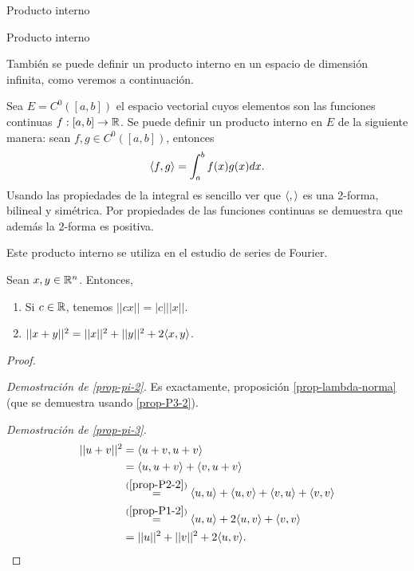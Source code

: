 \begin{chapter}{Producto interno}
\begin{section}{Producto interno}
        \begin{ejemplo*} También  se puede definir un producto interno en un espacio de dimensión infinita, como veremos a continuación.
            
            Sea $E = C^0([a,b])$ el espacio vectorial cuyos elementos son las funciones continuas $f: [a, b] \to\mathbb R$. Se puede definir un producto interno en $E$ de la siguiente manera: sean $f,g \in  C^0([a,b])$,  entonces
            \begin{equation*}
            \langle f, g \rangle = \int_a^b f(x)g(x) dx.
            \end{equation*}
            Usando las propiedades de la integral es sencillo ver que $\langle , \rangle $ es una 2-forma, bilineal y simétrica. Por propiedades de las funciones continuas se demuestra que además la 2-forma es positiva. 
            
            Este producto interno se utiliza en el estudio de series de Fourier.
        \end{ejemplo*}
            
            
        
        
        \begin{proposicion} Sean   $x,y \in \mathbb R^n$. Entonces, 
            \begin{enumerate}
                \item\label{prop-pi-2} Si $c \in \mathbb R$, tenemos $||cx|| = |c|||x||$.
                \item\label{prop-pi-3} $||x+y||^2 = ||x||^2 + ||y||^2 + 2\langle x,y\rangle$. 
            \end{enumerate}
        \end{proposicion}
        \begin{proof}
            
            ${}^{}$
            
            \textit{Demostración de \ref{prop-pi-2}.}  Es exactamente, proposición \ref{prop-lambda-norma} (que se demuestra usando \ref{prop-P3-2}).
            
            \textit{Demostración de \ref{prop-pi-3}.}
            \begin{align*}
                ||u+v||^2 &= \langle u+v,u+v\rangle\\
                &= \langle u,u+v\rangle+ \langle v,u+v\rangle  \\
                &\overset{(\ref{prop-P2-2})}{=} \langle u,u\rangle+ \langle u,v\rangle+\langle v,u\rangle+ \langle v,v\rangle  \\
                &\overset{(\ref{prop-P1-2})}{=} \langle u,u\rangle+ 2\langle u,v\rangle+ \langle v,v\rangle  \\
                &=||u||^2 + ||v||^2 + 2\langle u,v\rangle.
            \end{align*}
            

\end{proof}
\end{section}
\end{chapter}
